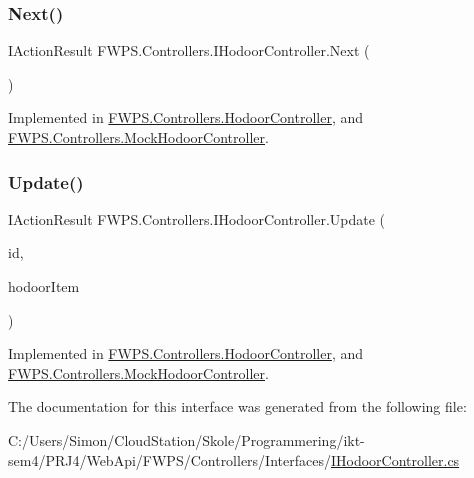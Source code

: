 \subsubsection{\texorpdfstring{Next()}{Next()}}
{\footnotesize\ttfamily I\+Action\+Result F\+W\+P\+S.\+Controllers.\+I\+Hodoor\+Controller.\+Next (\begin{DoxyParamCaption}{ }\end{DoxyParamCaption})}



Implemented in \mbox{\hyperlink{class_f_w_p_s_1_1_controllers_1_1_hodoor_controller_ac5008a5159d83bffd779b742bd9e6555}{F\+W\+P\+S.\+Controllers.\+Hodoor\+Controller}}, and \mbox{\hyperlink{class_f_w_p_s_1_1_controllers_1_1_mock_hodoor_controller_a58c25ec4850b5c078ba684d3c5c18341}{F\+W\+P\+S.\+Controllers.\+Mock\+Hodoor\+Controller}}.

\mbox{\label{interface_f_w_p_s_1_1_controllers_1_1_i_hodoor_controller_a9550c77b49185af0d0e6ba79514535f5}} 
\subsubsection{\texorpdfstring{Update()}{Update()}}
{\footnotesize\ttfamily I\+Action\+Result F\+W\+P\+S.\+Controllers.\+I\+Hodoor\+Controller.\+Update (\begin{DoxyParamCaption}\item[{long}]{id,  }\item[{\mbox{[}\+From\+Body\mbox{]} \mbox{\hyperlink{class_f_w_p_s_1_1_models_1_1_hodoor_item}{Hodoor\+Item}}}]{hodoor\+Item }\end{DoxyParamCaption})}



Implemented in \mbox{\hyperlink{class_f_w_p_s_1_1_controllers_1_1_hodoor_controller_a024011e1456e9634e741fdbc30ddd482}{F\+W\+P\+S.\+Controllers.\+Hodoor\+Controller}}, and \mbox{\hyperlink{class_f_w_p_s_1_1_controllers_1_1_mock_hodoor_controller_a094bcc198643c2097f99ef9c21dd40da}{F\+W\+P\+S.\+Controllers.\+Mock\+Hodoor\+Controller}}.



The documentation for this interface was generated from the following file\+:\begin{DoxyCompactItemize}
\item 
C\+:/\+Users/\+Simon/\+Cloud\+Station/\+Skole/\+Programmering/ikt-\/sem4/\+P\+R\+J4/\+Web\+Api/\+F\+W\+P\+S/\+Controllers/\+Interfaces/\mbox{\hyperlink{_i_hodoor_controller_8cs}{I\+Hodoor\+Controller.\+cs}}\end{DoxyCompactItemize}
